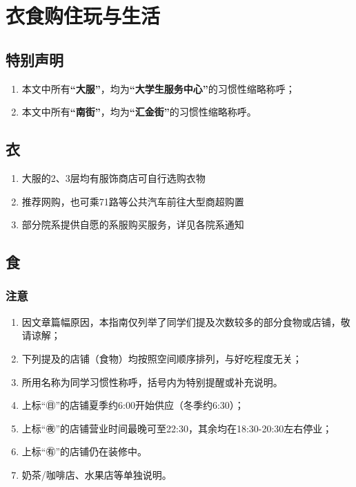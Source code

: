\chapter[衣食购住玩与生活]{衣食购住玩与生活}

\section*{特别声明}
\begin{enumerate}
    \item 本文中所有\textbf{“大服”}，均为\textbf{“大学生服务中心”}的习惯性缩略称呼；
    \item 本文中所有\textbf{“南街”}，均为\textbf{“汇金街”}的习惯性缩略称呼。
\end{enumerate}
\section[衣]{衣}
\begin{enumerate}
    \item 大服的2、3层均有服饰商店可自行选购衣物
    \item 推荐网购，也可乘71路等公共汽车前往大型商超购置
    \item 部分院系提供自愿的系服购买服务，详见各院系通知
\end{enumerate}

\section[食]{食}
\subsection*{注意}
\begin{enumerate}
    \item 因文章篇幅原因，本指南仅列举了同学们提及次数较多的部分食物或店铺，敬请谅解；
    \item 下列提及的店铺（食物）均按照空间顺序排列，与好吃程度无关；
    \item 所用名称为同学习惯性称呼，括号内为特别提醒或补充说明。
    \item 上标“㊐”的店铺夏季约6:00开始供应（冬季约6:30）；
    \item 上标“㊰”的店铺营业时间最晚可至22:30，其余均在18:30-20:30左右停业；
    \item 上标“㊒”的店铺仍在装修中。
    \item 奶茶/咖啡店、水果店等单独说明。
\end{enumerate}

